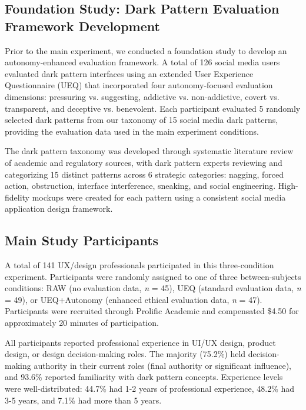
\subsection{Foundation Study: Dark Pattern Evaluation Framework Development}

Prior to the main experiment, we conducted a foundation study to develop an autonomy-enhanced evaluation framework. A total of 126 social media users evaluated dark pattern interfaces using an extended User Experience Questionnaire (UEQ) that incorporated four autonomy-focused evaluation dimensions: pressuring vs. suggesting, addictive vs. non-addictive, covert vs. transparent, and deceptive vs. benevolent. Each participant evaluated 5 randomly selected dark patterns from our taxonomy of 15 social media dark patterns, providing the evaluation data used in the main experiment conditions.

The dark pattern taxonomy was developed through systematic literature review of academic and regulatory sources, with dark pattern experts reviewing and categorizing 15 distinct patterns across 6 strategic categories: nagging, forced action, obstruction, interface interference, sneaking, and social engineering. High-fidelity mockups were created for each pattern using a consistent social media application design framework.

\subsection{Main Study Participants}

A total of 141 UX/design professionals participated in this three-condition experiment. Participants were randomly assigned to one of three between-subjects conditions: RAW (no evaluation data, \textit{n} = 45), UEQ (standard evaluation data, \textit{n} = 49), or UEQ+Autonomy (enhanced ethical evaluation data, \textit{n} = 47). Participants were recruited through Prolific Academic and compensated \$4.50 for approximately 20 minutes of participation. 

All participants reported professional experience in UI/UX design, product design, or design decision-making roles. The majority (75.2\%) held decision-making authority in their current roles (final authority or significant influence), and 93.6\% reported familiarity with dark pattern concepts. Experience levels were well-distributed: 44.7\% had 1-2 years of professional experience, 48.2\% had 3-5 years, and 7.1\% had more than 5 years.

